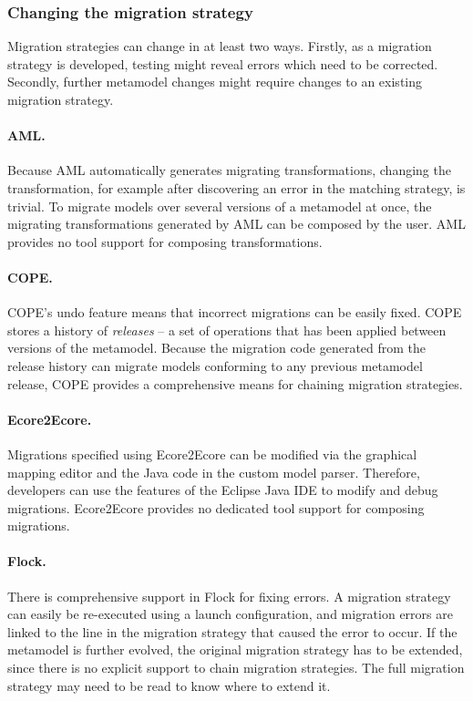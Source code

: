 \subsubsection{Changing the migration strategy}
Migration strategies can change in at least two ways. Firstly, as a migration strategy is developed, testing might reveal errors which need to be corrected. Secondly, further metamodel changes might require changes to an existing migration strategy.

\paragraph{AML.}  Because AML automatically generates migrating transformations, changing the transformation, for example after discovering an error in the matching strategy, is trivial. To migrate models over several versions of a metamodel at once, the migrating transformations generated by AML can be composed by the user. AML provides no tool support for composing transformations.

\paragraph{COPE.} COPE's undo feature
means that incorrect migrations can be easily fixed. COPE stores a history of \emph{releases} -- a set of operations that has been applied between versions of the metamodel. Because the migration code generated from the release history can migrate models conforming to any previous metamodel release, COPE provides a comprehensive means for chaining migration strategies. 

\paragraph{Ecore2Ecore.} Migrations specified using Ecore2Ecore can be modified via the graphical mapping editor and the Java code in the custom model parser. Therefore, developers can use the features of the Eclipse Java IDE to modify and debug migrations. Ecore2Ecore provides no dedicated tool support for composing migrations.

\paragraph{Flock.} There is comprehensive support in Flock for fixing errors. A migration strategy can easily be re-executed using a launch configuration, and migration errors are linked to the line in the migration strategy that caused the error to occur. If the metamodel is further evolved, the original migration strategy has to be extended, since there is no explicit support to chain migration strategies. The full migration strategy may need to be read to know where to extend it.


